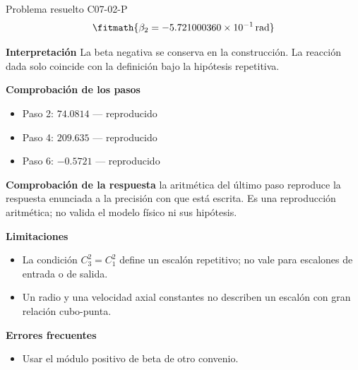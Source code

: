 \documentclass[10pt,openany]{book}
\begin{document}
\begin{studiumworked}{Problema resuelto C07-02-P}
\[
\fitmath{\beta_2=-5.721000360\times10^{-1}\,\mathrm{rad}}
\]

\noindent\textbf{Interpretación}
La beta negativa se conserva en la construcción. La reacción dada solo coincide con la definición bajo la hipótesis repetitiva.

\noindent\textbf{Comprobación de los pasos}
\begin{itemize}
\item Paso 2: $74.0814$ — reproducido
\item Paso 4: $209.635$ — reproducido
\item Paso 6: $-0.5721$ — reproducido
\end{itemize}

\noindent\textbf{Comprobación de la respuesta} la aritmética del último paso reproduce la respuesta enunciada a la precisión con que está escrita. Es una reproducción aritmética; no valida el modelo físico ni sus hipótesis.

\noindent\textbf{Limitaciones}
\begin{itemize}
\item La condición $C_3^2=C_1^2$ define un escalón repetitivo; no vale para escalones de entrada o de salida.
\item Un radio y una velocidad axial constantes no describen un escalón con gran relación cubo-punta.
\end{itemize}

\noindent\textbf{Errores frecuentes}
\begin{itemize}
\item Usar el módulo positivo de beta de otro convenio.
\end{itemize}
\end{studiumworked}
\end{document}
